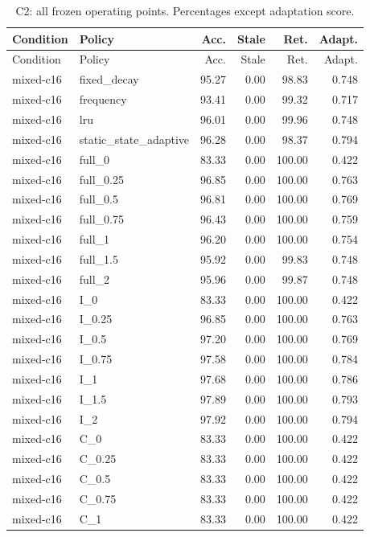 \begin{longtable}{llrrrr}\caption{C2: all frozen operating points. Percentages except adaptation score.}\label{tab:C2}\\\toprule Condition & Policy & Acc. & Stale & Ret. & Adapt.\\\midrule\endfirsthead\toprule Condition & Policy & Acc. & Stale & Ret. & Adapt.\\\midrule\endhead
mixed-c16 & fixed\_decay & 95.27 & 0.00 & 98.83 & 0.748\\
mixed-c16 & frequency & 93.41 & 0.00 & 99.32 & 0.717\\
mixed-c16 & lru & 96.01 & 0.00 & 99.96 & 0.748\\
mixed-c16 & static\_state\_adaptive & 96.28 & 0.00 & 98.37 & 0.794\\
mixed-c16 & full\_0 & 83.33 & 0.00 & 100.00 & 0.422\\
mixed-c16 & full\_0.25 & 96.85 & 0.00 & 100.00 & 0.763\\
mixed-c16 & full\_0.5 & 96.81 & 0.00 & 100.00 & 0.769\\
mixed-c16 & full\_0.75 & 96.43 & 0.00 & 100.00 & 0.759\\
mixed-c16 & full\_1 & 96.20 & 0.00 & 100.00 & 0.754\\
mixed-c16 & full\_1.5 & 95.92 & 0.00 & 99.83 & 0.748\\
mixed-c16 & full\_2 & 95.96 & 0.00 & 99.87 & 0.748\\
mixed-c16 & I\_0 & 83.33 & 0.00 & 100.00 & 0.422\\
mixed-c16 & I\_0.25 & 96.85 & 0.00 & 100.00 & 0.763\\
mixed-c16 & I\_0.5 & 97.20 & 0.00 & 100.00 & 0.769\\
mixed-c16 & I\_0.75 & 97.58 & 0.00 & 100.00 & 0.784\\
mixed-c16 & I\_1 & 97.68 & 0.00 & 100.00 & 0.786\\
mixed-c16 & I\_1.5 & 97.89 & 0.00 & 100.00 & 0.793\\
mixed-c16 & I\_2 & 97.92 & 0.00 & 100.00 & 0.794\\
mixed-c16 & C\_0 & 83.33 & 0.00 & 100.00 & 0.422\\
mixed-c16 & C\_0.25 & 83.33 & 0.00 & 100.00 & 0.422\\
mixed-c16 & C\_0.5 & 83.33 & 0.00 & 100.00 & 0.422\\
mixed-c16 & C\_0.75 & 83.33 & 0.00 & 100.00 & 0.422\\
mixed-c16 & C\_1 & 83.33 & 0.00 & 100.00 & 0.422\\

\end{longtable}
